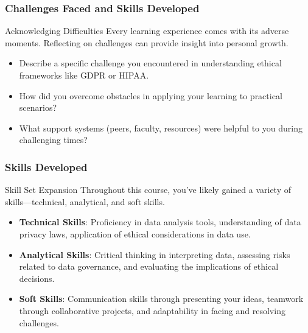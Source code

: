 \documentclass[aspectratio=169]{beamer}
\begin{document}
\begin{frame}[fragile]
    \frametitle{Challenges Faced and Skills Developed}
    \begin{block}{Acknowledging Difficulties}
        Every learning experience comes with its adverse moments. Reflecting on challenges can provide insight into personal growth.
    \end{block}
    \begin{itemize}
        \item Describe a specific challenge you encountered in understanding ethical frameworks like GDPR or HIPAA.
        \item How did you overcome obstacles in applying your learning to practical scenarios?
        \item What support systems (peers, faculty, resources) were helpful to you during challenging times?
    \end{itemize}
\end{frame}

\begin{frame}[fragile]
    \frametitle{Skills Developed}
    \begin{block}{Skill Set Expansion}
        Throughout this course, you've likely gained a variety of skills—technical, analytical, and soft skills.
    \end{block}
    \begin{itemize}
        \item \textbf{Technical Skills}: Proficiency in data analysis tools, understanding of data privacy laws, application of ethical considerations in data use.
        \item \textbf{Analytical Skills}: Critical thinking in interpreting data, assessing risks related to data governance, and evaluating the implications of ethical decisions.
        \item \textbf{Soft Skills}: Communication skills through presenting your ideas, teamwork through collaborative projects, and adaptability in facing and resolving challenges.
    \end{itemize}
\end{frame}
\end{document}
